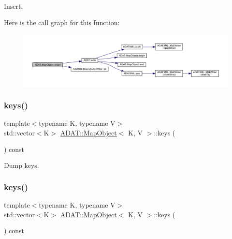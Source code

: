 Insert. 

Here is the call graph for this function\+:
\nopagebreak
\begin{figure}[H]
\begin{center}
\leavevmode
\includegraphics[width=350pt]{da/d29/classADAT_1_1MapObject_aaa819ee6219acf8f74c39563c9c68ab4_cgraph}
\end{center}
\end{figure}
\mbox{\label{classADAT_1_1MapObject_af767d0e9da82e3a249d3340d57da66e1}} 
\subsubsection{\texorpdfstring{keys()}{keys()}\hspace{0.1cm}{\footnotesize\ttfamily [1/3]}}
{\footnotesize\ttfamily template$<$typename K, typename V$>$ \\
std\+::vector$<$K$>$ \mbox{\hyperlink{classADAT_1_1MapObject}{A\+D\+A\+T\+::\+Map\+Object}}$<$ K, V $>$\+::keys (\begin{DoxyParamCaption}{ }\end{DoxyParamCaption}) const\hspace{0.3cm}{\ttfamily [inline]}}



Dump keys. 

\mbox{\label{classADAT_1_1MapObject_af767d0e9da82e3a249d3340d57da66e1}} 
\subsubsection{\texorpdfstring{keys()}{keys()}\hspace{0.1cm}{\footnotesize\ttfamily [2/3]}}
{\footnotesize\ttfamily template$<$typename K, typename V$>$ \\
std\+::vector$<$K$>$ \mbox{\hyperlink{classADAT_1_1MapObject}{A\+D\+A\+T\+::\+Map\+Object}}$<$ K, V $>$\+::keys (\begin{DoxyParamCaption}{ }\end{DoxyParamCaption}) const\hspace{0.3cm}{\ttfamily [inline]}}



